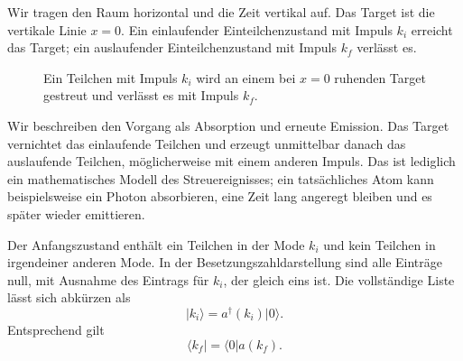 Wir tragen den Raum horizontal und die Zeit vertikal auf. Das Target ist die vertikale Linie \(x=0\). Ein einlaufender Einteilchenzustand mit Impuls \(k_i\) erreicht das Target; ein auslaufender Einteilchenzustand mit Impuls \(k_f\) verlässt es.

\begin{figure}[h]
\centering
{}
\caption{Ein Teilchen mit Impuls \(k_i\) wird an einem bei \(x=0\) ruhenden Target gestreut und verlässt es mit Impuls \(k_f\).}
\end{figure}

Wir beschreiben den Vorgang als Absorption und erneute Emission. Das Target vernichtet das einlaufende Teilchen und erzeugt unmittelbar danach das auslaufende Teilchen, möglicherweise mit einem anderen Impuls. Das ist lediglich ein mathematisches Modell des Streuereignisses; ein tatsächliches Atom kann beispielsweise ein Photon absorbieren, eine Zeit lang angeregt bleiben und es später wieder emittieren.

\begin{classroomqa}
\end{classroomqa}

Der Anfangszustand enthält ein Teilchen in der Mode \(k_i\) und kein Teilchen in irgendeiner anderen Mode. In der Besetzungszahldarstellung sind alle Einträge null, mit Ausnahme des Eintrags für \(k_i\), der gleich eins ist. Die vollständige Liste lässt sich abkürzen als
\begin{equation}
\lvert k_i\rangle=a^\dagger(k_i)\lvert0\rangle.
\end{equation}
Entsprechend gilt
\begin{equation}
\langle k_f\rvert=\langle0\rvert a(k_f).
\end{equation}

